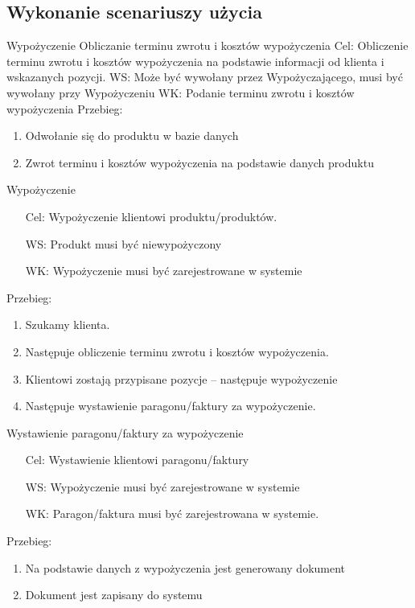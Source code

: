 \documentclass{article}
\begin{document}
	\subsection{Wykonanie scenariuszy użycia}	
\LARGE 	Wypożyczenie 
\Large	Obliczanie terminu zwrotu i kosztów wypożyczenia \newline
\normalsize	Cel: Obliczenie terminu zwrotu i kosztów wypożyczenia na podstawie informacji od klienta i wskazanych pozycji.\newline
	WS: Może być wywołany przez Wypożyczającego, musi być wywołany przy Wypożyczeniu \newline
	WK: Podanie terminu zwrotu i kosztów wypożyczenia\newline
	Przebieg:
\begin{enumerate}
	\item Odwołanie się do produktu w bazie danych
	\item Zwrot terminu i kosztów wypożyczenia na podstawie danych produktu
\end{enumerate}
\Large Wypożyczenie
\normalsize
\begin{enumerate}
	\item[Cel:] Wypożyczenie klientowi produktu/produktów. 
	\item[WS:] Produkt musi być niewypożyczony 
	\item[WK:] Wypożyczenie musi być zarejestrowane w systemie 
\end{enumerate}
Przebieg:
	\begin{enumerate}
		\item Szukamy klienta.
		\item Następuje obliczenie terminu zwrotu i kosztów wypożyczenia.
		\item Klientowi zostają przypisane pozycje – następuje wypożyczenie
		\item Następuje wystawienie paragonu/faktury za wypożyczenie.
	\end{enumerate}
\Large	Wystawienie paragonu/faktury za wypożyczenie 
\normalsize
\begin{enumerate}
	\item[Cel:] Wystawienie klientowi paragonu/faktury
	\item[WS:] Wypożyczenie musi być zarejestrowane w systemie
	\item[WK:]  Paragon/faktura musi być zarejestrowana w systemie.
\end{enumerate}
	Przebieg:
	\begin{enumerate}
		\item Na podstawie danych z wypożyczenia jest generowany dokument
		\item 	Dokument jest zapisany do systemu
	\end{enumerate}
\end{document}
